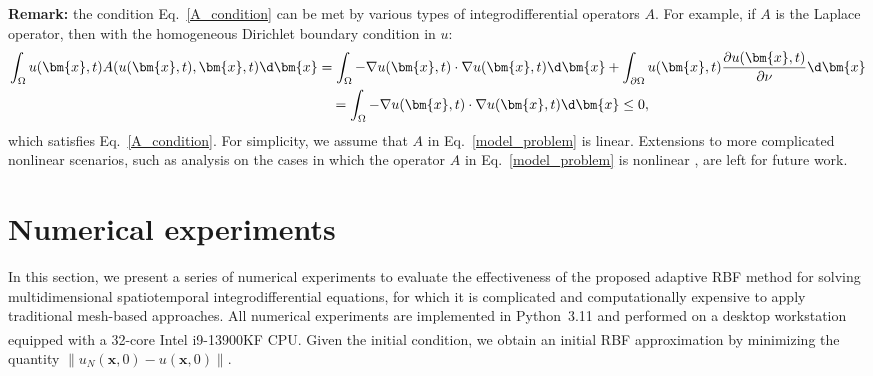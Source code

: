 \textbf{Remark:} the condition Eq.~\eqref{A_condition} can be met by various types of integrodifferential operators $A$. For example, if $A$ is the Laplace operator, then with the homogeneous Dirichlet boundary condition in $u$:
\begin{equation}
\begin{aligned}
    \int_{\Omega} u(\bm{x}, t)A(u(\bm{x}, t), \bm{x}, t)\d\bm{x} &= \int_{\Omega} -\nabla u(\bm{x}, t)\cdot \nabla u(\bm{x}, t)\d\bm{x} + \int_{\partial\Omega}u(\bm{x}, t)\frac{\partial u(\bm{x}, t)}{\partial \nu}\d\bm{x}\\
    &\quad =\int_{\Omega} -\nabla u(\bm{x}, t)\cdot \nabla u(\bm{x}, t)\d\bm{x}\leq 0,
    \end{aligned}
\end{equation}
which satisfies Eq.~\eqref{A_condition}. For simplicity, we assume that $A$ in Eq.~\eqref{model_problem} is linear.
Extensions to more complicated nonlinear scenarios, such as analysis on the cases in which the operator $A$ in Eq.~\eqref{model_problem} is nonlinear \cite{deng2025adaptive}, are left for future work.

\section{Numerical experiments}
\label{section3}
In this section, we present a series of numerical experiments to evaluate the effectiveness of the proposed adaptive RBF method for solving multidimensional spatiotemporal integrodifferential equations, for which it is complicated and computationally expensive to apply traditional mesh-based approaches. All numerical experiments are implemented in Python~3.11 and performed on a desktop workstation equipped with a 32-core Intel\textsuperscript{\textregistered} i9-13900KF CPU. Given the initial condition, we obtain an initial RBF approximation by minimizing the quantity $\|u_N(\bm{x},0) - u(\bm{x},0)\|$.


